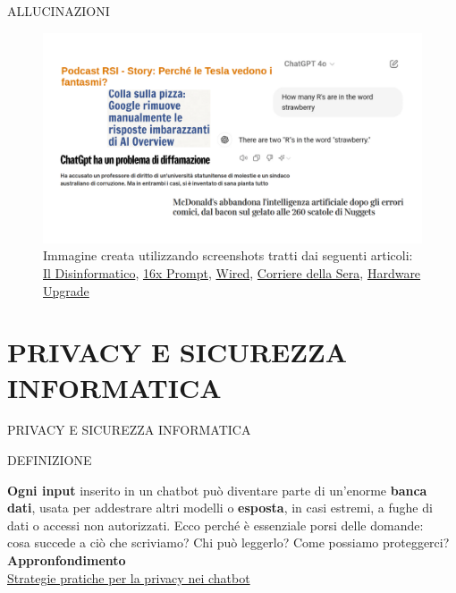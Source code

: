 \documentclass[aspectratio=1610]{beamer}
\begin{document}
\begin{frame}{ALLUCINAZIONI}
    \begin{figure}
        \includegraphics[width=.9\linewidth]{img/allucinazioni.png}
        \caption{
            Immagine creata utilizzando screenshots tratti dai seguenti articoli:
            \href{https://attivissimo.blogspot.com/2023/05/podcast-rsi-story-perche-le-tesla.html}{Il Disinformatico}, 
            \href{https://prompt.16x.engineer/blog/why-chatgpt-cant-count-rs-in-strawberry}{16x Prompt}, 
            \href{https://www.wired.it/article/chatgpt-diffamazione-molestie-problema/}{Wired}, 
            \href{https://www.corriere.it/esteri/24_giugno_23/mcdonalds-abbandona-intelligenza-artificiale-e67cd9a6-7ebd-4436-9ff0-de55eb486xlk.shtml}{Corriere della Sera}, 
            \href{https://www.hwupgrade.it/news/web/colla-sulla-pizza-google-rimuove-manualmente-le-risposte-imbarazzanti-di-ai-overview_127538.html}{Hardware Upgrade}
        }
    \end{figure}
\end{frame}

\section{PRIVACY E SICUREZZA INFORMATICA}

\begin{frame}{PRIVACY E SICUREZZA INFORMATICA}
    \begin{alertblock}{DEFINIZIONE}
        \begin{minipage}{0.96\linewidth}
            \justifying
            \textbf{Ogni input} inserito in un chatbot può diventare parte di un’enorme \textbf{banca dati}, 
            usata per addestrare altri modelli o \textbf{esposta}, in casi estremi, a fughe di dati o 
            accessi non autorizzati. Ecco perché è essenziale porsi delle domande: \\
            cosa succede a ciò che scriviamo? Chi può leggerlo? Come possiamo proteggerci?\\
            \bigskip
            \tiny{\textbf{Appronfondimento}}\\
            \tiny{\href{https://www.agendadigitale.eu/sicurezza/privacy/i-chatbot-e-lillusione-della-privacy-9-modi-per-difendere-i-nostri-dati/}{Strategie pratiche per la privacy nei chatbot}}
        \end{minipage}
    \end{alertblock}
\end{frame}
\end{document}
